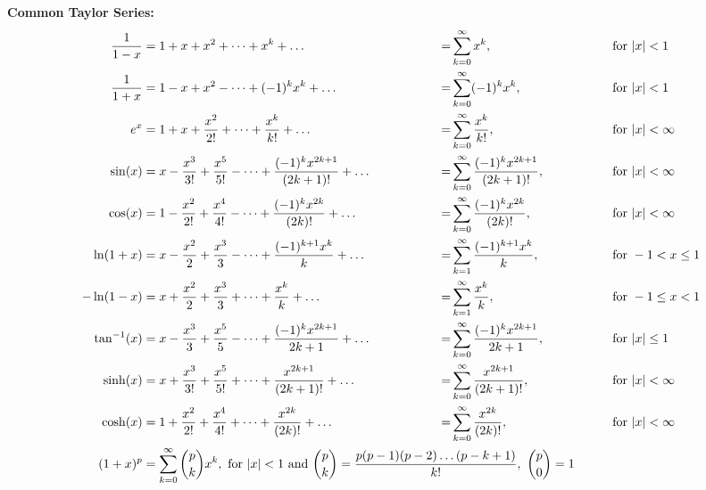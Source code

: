 \documentclass[../mathNotesPreamble]{subfiles}
\begin{document}
    \noindent\textbf{Common Taylor Series:}\mbox{}
    \begingroup
      \addtolength{\jot}{0.63\baselineskip}
      \begin{alignat*}{4}
        \frac{1}{1-x}&= 1+x+x^2+\dots+x^k+\dots\hspace*{35mm}&=&\sum_{k=0}^\infty x^k,&\hspace*{15mm}&\textnormal{ for }\abs{x}<1\\
        \frac{1}{1+x}&= 1-x+x^2-\dots+(-1)^kx^k+\dots\ &=&\sum_{k=0}^\infty (-1)^k x^k,&&\textnormal{ for }\abs{x}<1\\
        e^x&=1+x+\frac{x^2}{2!}+\dots+\frac{x^k}{k!}+\dots\ &=&\sum_{k=0}^\infty \frac{x^k}{k!},&&\textnormal{ for }\abs{x}<\infty\\
        \sin(x)&=x-\frac{x^3}{3!}+\frac{x^5}{5!}-\dots+\frac{(-1)^k x^{2k+1}}{(2k+1)!}+\dots\ &=&\sum_{k=0}^\infty \frac{(-1)^k x^{2k+1}}{(2k+1)!},&&\textnormal{ for } \abs{x}<\infty\\
        \cos(x)&=1-\frac{x^2}{2!}+\frac{x^4}{4!}-\dots+\frac{(-1)^k x^{2k}}{(2k)!}+\dots\ &=&\sum_{k=0}^\infty \frac{(-1)^k x^{2k}}{(2k)!},&&\textnormal{ for } \abs{x}<\infty\\
        \ln(1+x)&=x-\frac{x^2}{2}+\frac{x^3}{3}-\dots+\frac{(-1)^{k+1}x^k}{k}+\dots\ &=&\sum_{k=1}^\infty \frac{(-1)^{k+1}x^k}{k},&&\textnormal{ for } -1<x\leq 1\\
        -\ln(1-x)&=x+\frac{x^2}{2}+\frac{x^3}{3}+\dots+\frac{x^k}{k}+\dots\ &=&\sum_{k=1}^\infty \frac{x^k}{k},&&\textnormal{ for } -1\leq x< 1\\
        \tan\inv(x)&=x-\frac{x^3}{3}+\frac{x^5}{5}-\dots+\frac{(-1)^k x^{2k+1}}{2k+1}+\dots\ &=&\sum_{k=0}^\infty \frac{(-1)^k x^{2k+1}}{2k+1},&&\textnormal{ for } \abs{x}\leq 1\\
        \sinh(x)&= x+\frac{x^3}{3!}+\frac{x^5}{5!}+\dots+ \frac{x^{2k+1}}{(2k+1)!}+\dots\ &=&\sum_{k=0}^\infty \frac{x^{2k+1}}{(2k+1)!},&&\textnormal{ for } \abs{x}<\infty\\
        \cosh(x)&= 1+\frac{x^2}{2!}+\frac{x^4}{4!}+\dots+ \frac{x^{2k}}{(2k)!}+\dots\ &=&\sum_{k=0}^\infty \frac{x^{2k}}{(2k)!},&&\textnormal{ for } \abs{x}<\infty\\
        (1+x)^p&=\sum_{k=0}^\infty {p\choose k} x^k, \textnormal{ for } \abs{x}<1 \textnormal{ and } \mathrlap{{p\choose k}=\frac{p(p-1)(p-2)\dots(p-k+1)}{k!},\ {p\choose 0}=1}
      \end{alignat*}
    \endgroup
    \pagebreak
\end{document}
